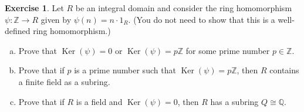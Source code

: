 \documentclass{article}
\newcommand{\bbz}{\mathbb{Z}}
\newcommand{\bbq}{\mathbb{Q}}
\renewcommand{\ker}{\operatorname{Ker}}
\theoremstyle{plain}
\theoremstyle{definition}
\newtheorem{exer}[lem]{Exercise}
\begin{document}
\begin{exer}
Let $R$ be an integral domain and consider the ring homomorphism $\psi\colon\bbz\to R$ given by $\psi(n)=n\cdot 1_R$.
(You do not need to show that this is a well-defined ring homomorphism.)
\begin{enumerate}[(a)]
\item Prove that $\ker(\psi)=0$ or $\ker(\psi)=p\bbz$ for some prime number $p\in\bbz$.
\item Prove that if $p$ is a prime number such that $\ker(\psi)=p\bbz$, then $R$ contains a finite field as a subring.
\item Prove that if $R$ is a field and $\ker(\psi)=0$, then $R$ has a subring $Q\cong\bbq$.
\end{enumerate}
\end{exer}
\end{document}
